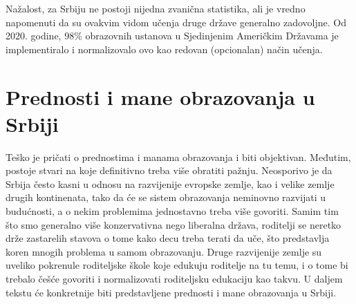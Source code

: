 \documentclass[a4paper]{article}
\begin{document}
Nažalost, za Srbiju ne postoji nijedna zvanična statistika, ali je vredno napomenuti da su ovakvim vidom učenja druge države generalno zadovoljne. Od 2020. godine, 98\% obrazovnih ustanova u Sjedinjenim Američkim Državama je implementiralo i normalizovalo ovo kao redovan (opcionalan) način učenja.\cite{referenca6}

\section{Prednosti i mane obrazovanja u Srbiji}
\label{sec:Prednosti}

Teško je pričati o prednostima i manama obrazovanja i biti objektivan. Međutim, postoje stvari na koje definitivno treba više obratiti pažnju. Neosporivo je da Srbija često kasni u odnosu na razvijenije evropske zemlje, kao i velike zemlje drugih kontinenata,  tako da će se sistem obrazovanja neminovno razvijati u budućnosti, a o nekim problemima jednostavno treba više govoriti. Samim tim što smo generalno više konzervativna nego liberalna država, roditelji se neretko drže zastarelih stavova o tome kako decu treba terati da uče, što predstavlja koren mnogih problema u samom obrazovanju. Druge razvijenije zemlje su uveliko pokrenule roditeljske škole koje edukuju roditelje na tu temu, i o tome bi trebalo češće govoriti i normalizovati roditeljsku edukaciju kao takvu. 
U daljem tekstu će konkretnije biti predstavljene prednosti i mane obrazovanja u Srbiji.
\end{document}
